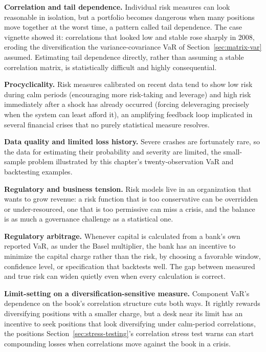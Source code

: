 \documentclass[../ai_in_finance]{subfiles}
\begin{document}
\textbf{Correlation and tail dependence.} Individual risk measures can look reasonable in isolation, but a portfolio becomes dangerous when many positions move together at the worst time, a pattern called tail dependence.
The case vignette showed it: correlations that looked low and stable rose sharply in 2008, eroding the diversification the variance-covariance VaR of Section~\ref{sec:matrix-var} assumed. Estimating tail dependence directly, rather than assuming a stable correlation matrix, is statistically difficult and highly consequential.

\textbf{Procyclicality.} Risk measures calibrated on recent data tend to show low risk during calm periods (encouraging more risk-taking and leverage) and high risk immediately after a shock has already occurred (forcing deleveraging precisely when the system can least afford it), an amplifying feedback loop implicated in several financial crises that no purely statistical measure resolves.

\textbf{Data quality and limited loss history.} Severe crashes are fortunately rare, so the data for estimating their probability and severity are limited, the small-sample problem illustrated by this chapter's twenty-observation VaR and backtesting examples.

\textbf{Regulatory and business tension.} Risk models live in an organization that wants to grow revenue: a risk function that is too conservative can be overridden or under-resourced, one that is too permissive can miss a crisis, and the balance is as much a governance challenge as a statistical one.

\textbf{Regulatory arbitrage.} Whenever capital is calculated from a bank's own reported VaR, as under the Basel multiplier, the bank has an incentive to minimize the capital charge rather than the risk, by choosing a favorable window, confidence level, or specification that backtests well. The gap between measured and true risk can widen quietly even when every calculation is correct.

\textbf{Limit-setting on a diversification-sensitive measure.} Component VaR's dependence on the book's correlation structure cuts both ways. It rightly rewards diversifying positions with a smaller charge, but a desk near its limit has an incentive to seek positions that look diversifying under calm-period correlations, the positions Section~\ref{sec:stress-testing}'s correlation stress test warns can start compounding losses when correlations move against the book in a crisis.
\end{document}

